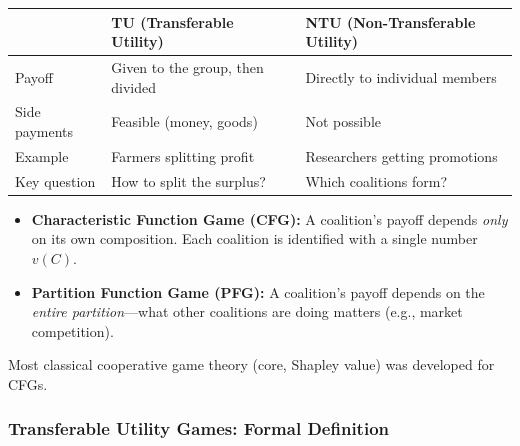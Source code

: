 \begin{defbox}
\begin{center}
\renewcommand{\arraystretch}{1.3}
\begin{tabular}{@{} l p{5.5cm} p{5.5cm} @{}}
\toprule
 & \textbf{TU (Transferable Utility)} & \textbf{NTU (Non-Transferable Utility)} \\
\midrule
Payoff & Given to the group, then divided & Directly to individual members \\
Side payments & Feasible (money, goods) & Not possible \\
Example & Farmers splitting profit & Researchers getting promotions \\
Key question & How to split the surplus? & Which coalitions form? \\
\bottomrule
\end{tabular}
\end{center}
\end{defbox}

\begin{defbox}
\begin{itemize}
  \item \textbf{Characteristic Function Game (CFG):} A coalition's payoff depends \textit{only} on its own composition. Each coalition is identified with a single number $v(C)$.
  \item \textbf{Partition Function Game (PFG):} A coalition's payoff depends on the \textit{entire partition}---what other coalitions are doing matters (e.g., market competition).
\end{itemize}

Most classical cooperative game theory (core, Shapley value) was developed for CFGs.
\end{defbox}

\separator

\subsubsection{Transferable Utility Games: Formal Definition}

